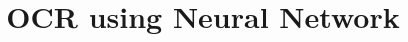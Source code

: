 \documentclass[12pt,a4paper]{report}
\title{OCR using Neural Network}
\begin{document}
\renewcommand\bibname{References}


%

%


\tableofcontents
\listoffigures

\newpage
{}





\printbibliography
\end{document}
